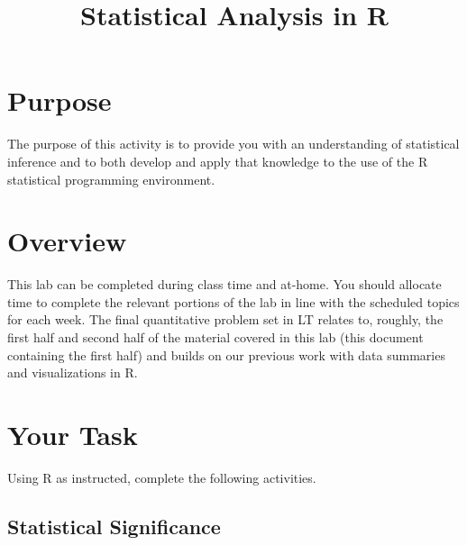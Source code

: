 \documentclass[a4paper,12pt]{article}
\title{Statistical Analysis in R}
\author{}
\date{}
\begin{document}
\vspace{-4em}

\maketitle

\vspace{-4em}

\section{Purpose}

The purpose of this activity is to provide you with an understanding of statistical inference and to both develop and apply that knowledge to the use of the R statistical programming environment.

\section{Overview}

This lab can be completed during class time and at-home. You should allocate time to complete the relevant portions of the lab in line with the scheduled topics for each week. The final quantitative problem set in LT relates to, roughly, the first half and second half of the material covered in this lab (this document containing the first half) and builds on our previous work with data summaries and visualizations in R.

\section{Your Task}

Using R as instructed, complete the following activities.

\subsection{Statistical Significance}
\end{document}
